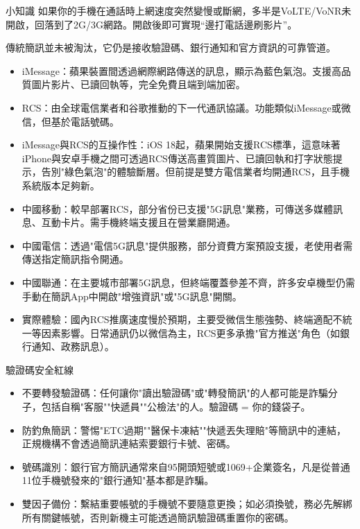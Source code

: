\begin{tcbinfo}{小知識}
如果你的手機在通話時上網速度突然變慢或斷網，多半是VoLTE/VoNR未開啟，回落到了2G/3G網路。開啟後即可實現“邊打電話邊刷影片”。

\end{tcbinfo}


傳統簡訊並未被淘汰，它仍是接收驗證碼、銀行通知和官方資訊的可靠管道。

\begin{itemize}
  \item iMessage：蘋果裝置間透過網際網路傳送的訊息，顯示為藍色氣泡。支援高品質圖片影片、已讀回執等，完全免費且端到端加密。
  \item RCS：由全球電信業者和谷歌推動的下一代通訊協議。功能類似iMessage或微信，但基於電話號碼。
  \item iMessage與RCS的互操作性：iOS 18起，蘋果開始支援RCS標準，這意味著iPhone與安卓手機之間可透過RCS傳送高畫質圖片、已讀回執和打字狀態提示，告別"綠色氣泡"的體驗斷層。但前提是雙方電信業者均開通RCS，且手機系統版本足夠新。
\end{itemize}


\begin{itemize}
  \item 中國移動：較早部署RCS，部分省份已支援"5G訊息"業務，可傳送多媒體訊息、互動卡片。需手機終端支援且在營業廳開通。
  \item 中國電信：透過"電信5G訊息"提供服務，部分資費方案預設支援，老使用者需傳送指定簡訊指令開通。
  \item 中國聯通：在主要城市部署5G訊息，但終端覆蓋參差不齊，許多安卓機型仍需手動在簡訊App中開啟"增強資訊"或"5G訊息"開關。
  \item 實際體驗：國內RCS推廣速度慢於預期，主要受微信生態強勢、終端適配不統一等因素影響。日常通訊仍以微信為主，RCS更多承擔"官方推送"角色（如銀行通知、政務訊息）。
\end{itemize}

\begin{tcbwarn}{驗證碼安全紅線}
\begin{itemize}
  \item 不要轉發驗證碼：任何讓你"讀出驗證碼"或"轉發簡訊"的人都可能是詐騙分子，包括自稱"客服""快遞員""公檢法"的人。驗證碼 = 你的錢袋子。
  \item 防釣魚簡訊：警惕"ETC過期""醫保卡凍結""快遞丟失理賠"等簡訊中的連結，正規機構不會透過簡訊連結索要銀行卡號、密碼。
  \item 號碼識別：銀行官方簡訊通常來自95開頭短號或1069+企業簽名，凡是從普通11位手機號發來的"銀行通知"基本都是詐騙。
  \item 雙因子備份：繫結重要帳號的手機號不要隨意更換；如必須換號，務必先解綁所有關鍵帳號，否則新機主可能透過簡訊驗證碼重置你的密碼。
\end{itemize}

\end{tcbwarn}

